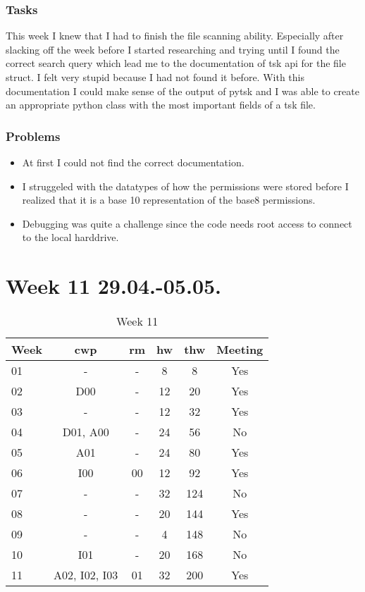 \subsubsection{Tasks}

This week I knew that I had to finish the file scanning ability. Especially after slacking off the week before I started researching and trying until I found the correct search query which lead me to the documentation of \gls{tsk} \gls{api} for the file struct. I felt very stupid because I had not found it before. With this documentation I could make sense of the output of \gls{pytsk} and I was able to create an appropriate python class with the most important fields of a \gls{tsk} file.  


\subsubsection{Problems}

\begin{itemize}
    \item At first I could not find the correct documentation.
    \item I struggeled with the datatypes of how the permissions were stored before I realized that it is a base 10 representation of the base8 permissions.
    \item Debugging was quite a challenge since the code needs root access to connect to the local harddrive.
\end{itemize}

\section{Week 11 29.04.-05.05.}
\label{sec:journal:week11}

\begin{table}[!ht]
    \begin{center}
        \caption{Week 11}
        \label{tab:journal:week11}
        \begin{tabular}{l|c|c|c|c|c}
            \textbf{Week} & \textbf{\gls{cwp}} & \textbf{\gls{rm}} & \textbf{\gls{hw}} & \textbf{\gls{thw}} & \textbf{Meeting}\\
        \hline
        01 & - & - & 8 & 8 & Yes \\
        02 & D00 & - & 12 & 20 & Yes \\
        03 & - & - & 12 & 32 & Yes \\
        04 & D01, A00 & - & 24 & 56 & No \\
        05 & A01 & - & 24 & 80 & Yes \\
        06 & I00 & 00 & 12 & 92 & Yes \\
        07 & - & - & 32 & 124 & No \\
        08 & - & - & 20 & 144 & Yes \\
        09 & - & - & 4 & 148 & No \\
        10 & I01 & - & 20 & 168 & No \\
        11 & A02, I02, I03 & 01 & 32 & 200 & Yes \\
        \end{tabular}
    \end{center}
\end{table}

